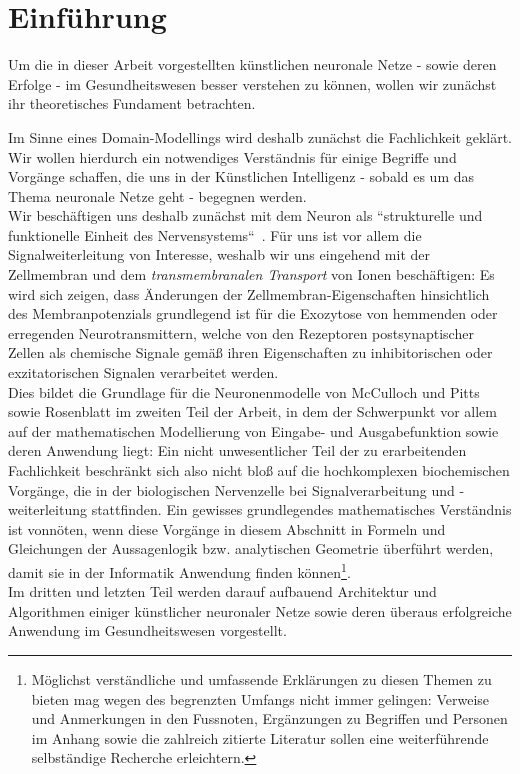 \chapter{Einführung}

Um die in dieser Arbeit vorgestellten künstlichen neuronale Netze - sowie deren Erfolge - im Gesundheitswesen besser verstehen zu können, wollen wir zunächst ihr theoretisches Fundament betrachten.

Im Sinne eines Domain-Modellings wird deshalb zunächst die Fachlichkeit geklärt.
Wir wollen hierdurch ein notwendiges Verständnis für einige Begriffe und Vorgänge schaffen, die uns in der Künstlichen Intelligenz - sobald es um das Thema neuronale Netze geht - begegnen werden. \\

Wir beschäftigen uns deshalb zunächst mit dem Neuron als ``strukturelle und funktionelle Einheit des Nervensystems``~\cite[42]{SD07}.
Für uns ist vor allem die Signalweiterleitung von Interesse, weshalb wir uns eingehend mit der Zellmembran und dem \textit{transmembranalen Transport} von Ionen beschäftigen: Es wird sich zeigen, dass Änderungen der Zellmembran-Eigenschaften hinsichtlich des Membranpotenzials grundlegend ist für die Exozytose von hemmenden oder erregenden Neurotransmittern, welche von den Rezeptoren postsynaptischer Zellen als chemische Signale gemäß ihren Eigenschaften zu inhibitorischen oder exzitatorischen Signalen verarbeitet werden.\\

Dies bildet die Grundlage für die Neuronenmodelle von McCulloch und Pitts sowie Rosenblatt im zweiten Teil der Arbeit, in dem der Schwerpunkt vor allem auf der mathematischen Modellierung von Eingabe- und Ausgabefunktion sowie deren Anwendung liegt: Ein nicht unwesentlicher Teil der zu erarbeitenden Fachlichkeit beschränkt sich also nicht bloß auf die hochkomplexen biochemischen Vorgänge, die in der biologischen Nervenzelle bei Signalverarbeitung und -weiterleitung stattfinden.
Ein gewisses grundlegendes mathematisches Verständnis ist vonnöten, wenn diese Vorgänge in diesem Abschnitt in Formeln und Gleichungen der Aussagenlogik {bzw.} analytischen Geometrie überführt werden, damit sie in der Informatik Anwendung finden können\footnote{
    Möglichst verständliche und umfassende Erklärungen zu diesen Themen zu bieten mag wegen des begrenzten Umfangs nicht immer gelingen: Verweise und Anmerkungen in den Fussnoten, Ergänzungen zu Begriffen und Personen im Anhang sowie die zahlreich zitierte Literatur sollen eine weiterführende selbständige Recherche erleichtern.
}.\\

Im dritten und letzten Teil werden darauf aufbauend Architektur und Algorithmen einiger künstlicher neuronaler Netze sowie deren überaus erfolgreiche Anwendung im Gesundheitswesen vorgestellt.